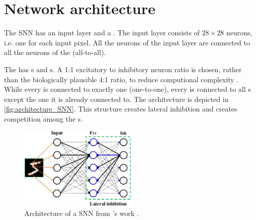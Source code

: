 \section{Network architecture}
\label{subsec:architecture}


The \ac{SNN} has an input layer and a \pLayer{} \cite{SNN}.
The input layer consists of $28 \times 28$ neurons, i.e. one for each input pixel.
All the neurons of the input layer are connected to all the neurons of the \pLayer{} (all-to-all).

The \pLayer{} has \eN{}s and \iN{}s.
A 1:1 excitatory to inhibitory neuron ratio is chosen, rather than the biologically plausible 4:1 ratio, 
to reduce computional complexity \cite{SNN}.
While every \eN{} is connected to exactly one \iN{} (one-to-one), every \iN{} is connected to all \eN{}s except the one it is already connected to.
The architecture is depicted in \autoref{fig:architecture_SNN}.
This structure creates lateral inhibition and creates competition among the \eN{}s.
\vspace{-4mm}
\begin{figure}[htbp]
    \center
    \includegraphics[width=0.5\textwidth]{pictures/fnins-15-638474-g001.jpg}
    \caption{Architecture of a \ac{SNN} from \authorsArchitectureSNNpicture{}'s work \cite{architecture_SNN_picture}.}
    \label{fig:architecture_SNN}
\end{figure}